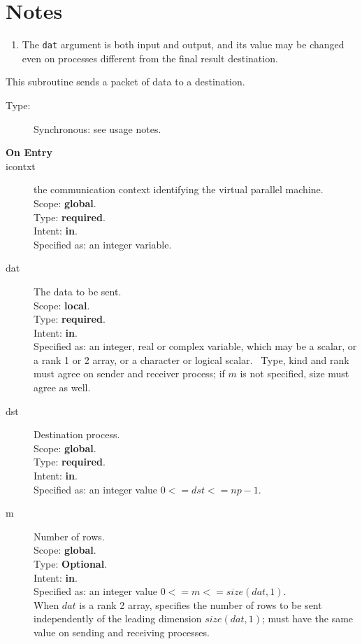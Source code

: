 \section*{Notes}
\begin{enumerate}
\item The \verb|dat| argument is both input and output, and its
  value may be changed even on processes different from the final
  result destination.
\end{enumerate}




This subroutine sends a packet of data to a destination.
\begin{description}
\item[Type:] Synchronous: see usage notes. 
\item[\bf  On Entry ]
\item[icontxt] the communication context identifying the virtual
  parallel machine.\\
Scope: {\bf global}.\\
Type: {\bf required}.\\
Intent: {\bf in}.\\
Specified as: an integer variable.
\item[dat] The data to be sent.\\
Scope: {\bf local}.\\
Type: {\bf required}.\\
Intent: {\bf in}.\\
Specified as: an integer, real or complex variable, which may be a
scalar, or a rank 1 or 2 array, or a character or logical scalar. \
Type, kind and  rank must agree on sender and receiver process; if $m$ is
not specified, size must agree as well. 
\item[dst] Destination process.\\
Scope: {\bf global}.\\
Type: {\bf required}.\\
Intent: {\bf in}.\\
Specified as: an integer value $0<= dst <= np-1$. \\
\item[m] Number of rows.\\
Scope: {\bf global}.\\
Type: {\bf Optional}.\\
Intent: {\bf in}.\\
Specified as: an integer value $0<= m <= size(dat,1)$. \\
When $dat$ is a rank 2 array, specifies the number of rows to be sent
independently of the leading dimension $size(dat,1)$; must have the
same value on sending and receiving processes.
\end{description}


